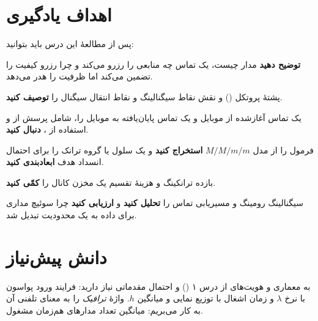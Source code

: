 \documentclass[11pt,a4paper]{article}
\begin{document}
\ACNcover

\section{اهداف یادگیری}
پس از مطالعهٔ این درس باید بتوانید:
\begin{objectives}
  \item \textbf{توضیح دهید} مدار چیست، یک تماس  چه منابعی را رزرو می‌کند و چرا
        رزرو کیفیت را تضمین می‌کند اما ظرفیت را هدر می‌دهد.
  \item پشتهٔ پروتکل  () و نقش نقاط سیگنالینگ و
        نقاط انتقال سیگنال را \textbf{توصیف کنید}.
  \item یک تماس آغازشده از موبایل و یک تماس پایان‌یافته به موبایل را، شامل پرسش از 
        و استفاده از ، \textbf{دنبال کنید}.
  \item فرمول  را از مدل $M/M/m/m$ \textbf{استخراج کنید} و یک سلول یا گروه ترانک
        را برای احتمال انسداد هدف \textbf{ابعادبندی کنید}.
  \item بازده ترانکینگ و هزینهٔ تقسیم یک مخزن کانال را \textbf{کمّی کنید}.
  \item سیگنالینگ رومینگ و مسیریابی تماس را \textbf{تحلیل کنید} و \textbf{ارزیابی کنید} چرا
        سوئیچ مداری برای داده به یک محدودیت تبدیل شد.
\end{objectives}

\section{دانش پیش‌نیاز}
به معماری و هویت‌های  از درس ۱ () و احتمال
مقدماتی نیاز دارید: فرایند ورود پواسون با نرخ $\lambda$ و زمان اشغال با توزیع نمایی و
میانگین $h$. واژهٔ \emph{ترافیک} را به معنای تلفنی آن به کار می‌بریم: میانگین تعداد مدارهای
هم‌زمان مشغول.
\end{document}
